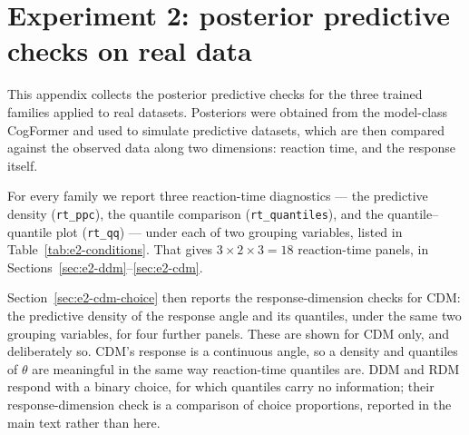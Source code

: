 %
%
%
%

\renewcommand{\topfraction}{0.92}
\renewcommand{\bottomfraction}{0.7}
\renewcommand{\textfraction}{0.06}
\renewcommand{\floatpagefraction}{0.6}

\section{Experiment 2: posterior predictive checks on real data}
\label{app:experiment-2-figures}

This appendix collects the posterior predictive checks for the three trained
families applied to real datasets. Posteriors were obtained from the
model-class CogFormer and used to simulate predictive datasets, which are then
compared against the observed data along two dimensions: reaction time, and the
response itself.

For every family we report three reaction-time diagnostics --- the predictive
density (\texttt{rt\_ppc}), the quantile comparison (\texttt{rt\_quantiles}),
and the quantile--quantile plot (\texttt{rt\_qq}) --- under each of two
grouping variables, listed in Table~\ref{tab:e2-conditions}. That gives
$3 \times 2 \times 3 = 18$ reaction-time panels, in
Sections~\ref{sec:e2-ddm}--\ref{sec:e2-cdm}.

Section~\ref{sec:e2-cdm-choice} then reports the response-dimension checks for
CDM: the predictive density of the response angle and its quantiles, under the
same two grouping variables, for four further panels. These are shown for CDM
only, and deliberately so. CDM's response is a continuous angle, so a density
and quantiles of $\theta$ are meaningful in the same way reaction-time
quantiles are. DDM and RDM respond with a binary choice, for which quantiles
carry no information; their response-dimension check is a comparison of choice
proportions, reported in the main text rather than here.

